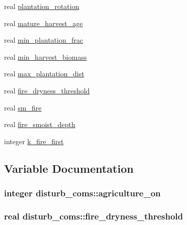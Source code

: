\begin{DoxyCompactItemize}
real \hyperlink{namespacedisturb__coms_a376a3a991d013bb7fc01f11392b85e71}{plantation\+\_\+rotation}
\item 
real \hyperlink{namespacedisturb__coms_af53cc051638d63f8646b4e46eef9366a}{mature\+\_\+harvest\+\_\+age}
\item 
real \hyperlink{namespacedisturb__coms_a05d657ee432105896bdb7fce6388217a}{min\+\_\+plantation\+\_\+frac}
\item 
real \hyperlink{namespacedisturb__coms_ab882a91f3ed60ed6a1532793d166e34d}{min\+\_\+harvest\+\_\+biomass}
\item 
real \hyperlink{namespacedisturb__coms_a0591e026b4cc3e583767cc06fe811531}{max\+\_\+plantation\+\_\+dist}
\item 
real \hyperlink{namespacedisturb__coms_ac6b6e373955307b8433f33253ca71d3d}{fire\+\_\+dryness\+\_\+threshold}
\item 
real \hyperlink{namespacedisturb__coms_a78e160b31b155e0e0dbddbe1c6614c1c}{sm\+\_\+fire}
\item 
real \hyperlink{namespacedisturb__coms_a62195251813b8226366eb5ae407dd196}{fire\+\_\+smoist\+\_\+depth}
\item 
integer \hyperlink{namespacedisturb__coms_a867cc15822253a03763c6890d6bdabc9}{k\+\_\+fire\+\_\+first}
\end{DoxyCompactItemize}


\subsection{Variable Documentation}
\hypertarget{namespacedisturb__coms_a42942f09e1f80adbb629f5bc82d36127}{}
\subsubsection[{agriculture\+\_\+on}]{\setlength{\rightskip}{0pt plus 5cm}integer disturb\+\_\+coms\+::agriculture\+\_\+on}\label{namespacedisturb__coms_a42942f09e1f80adbb629f5bc82d36127}
\hypertarget{namespacedisturb__coms_ac6b6e373955307b8433f33253ca71d3d}{}
\subsubsection[{fire\+\_\+dryness\+\_\+threshold}]{\setlength{\rightskip}{0pt plus 5cm}real disturb\+\_\+coms\+::fire\+\_\+dryness\+\_\+threshold}\label{namespacedisturb__coms_ac6b6e373955307b8433f33253ca71d3d}
\hypertarget{namespacedisturb__coms_afc2f848dc7eaa0f53d0b71df027ded1c}{}
